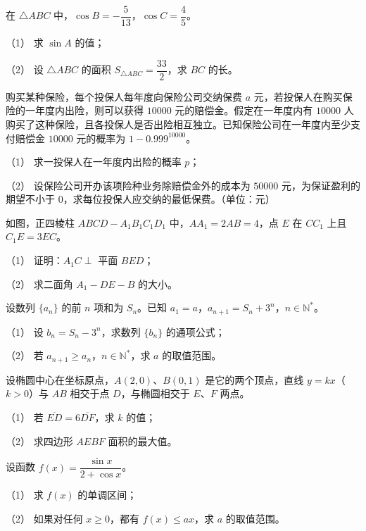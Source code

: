 \begin{question}
在 $\triangle ABC$ 中，$\cos B=-\dfrac5{13}$，$\cos C=\dfrac45$。

（1） 求 $\sin A$ 的值；

（2） 设 $\triangle ABC$ 的面积 $S_{\triangle ABC}=\dfrac{33}{2}$，求 $BC$ 的长。

\end{question}
\begin{question}
购买某种保险，每个投保人每年度向保险公司交纳保费 $a$ 元，若投保人在购买保险的一年度内出险，则可以获得 $10000$ 元的赔偿金。假定在一年度内有 $10000$ 人购买了这种保险，且各投保人是否出险相互独立。已知保险公司在一年度内至少支付赔偿金 $10000$ 元的概率为 $1-0.999^{10000}$。

（1） 求一投保人在一年度内出险的概率 $p$；

（2） 设保险公司开办该项险种业务除赔偿金外的成本为 $50000$ 元，为保证盈利的期望不小于 $0$，求每位投保人应交纳的最低保费。（单位：元）

\Needspace{0.4\textheight}
\end{question}
\begin{question}
如图，正四棱柱 $ABCD-A_1B_1C_1D_1$ 中，$AA_1=2AB=4$，点 $E$ 在 $CC_1$ 上且 $C_1E=3EC$。
\nopagebreak[4]
\begin{center}\end{center}
\nopagebreak[4]
（1） 证明：$A_1C\perp$ 平面 $BED$；

（2） 求二面角 $A_1-DE-B$ 的大小。

\end{question}
\begin{question}
设数列 $\{a_n\}$ 的前 $n$ 项和为 $S_n$。已知 $a_1=a$，$a_{n+1}=S_n+3^n$，$n\in\mathbb N^*$。

（1） 设 $b_n=S_n-3^n$，求数列 $\{b_n\}$ 的通项公式；

（2） 若 $a_{n+1}\geqslant a_n$，$n\in\mathbb N^*$，求 $a$ 的取值范围。

\end{question}
\begin{question}
设椭圆中心在坐标原点，$A(2,0)$、$B(0,1)$ 是它的两个顶点，直线 $y=kx$（$k>0$）与 $AB$ 相交于点 $D$，与椭圆相交于 $E\text{、}F$ 两点。

（1） 若 $\overline{ED}=6\overline{DF}$，求 $k$ 的值；

（2） 求四边形 $AEBF$ 面积的最大值。

\end{question}
\begin{question}
设函数 $f(x)=\dfrac{\sin x}{2+\cos x}$。

（1） 求 $f(x)$ 的单调区间；

（2） 如果对任何 $x\geqslant0$，都有 $f(x)\leqslant ax$，求 $a$ 的取值范围。

\end{question}